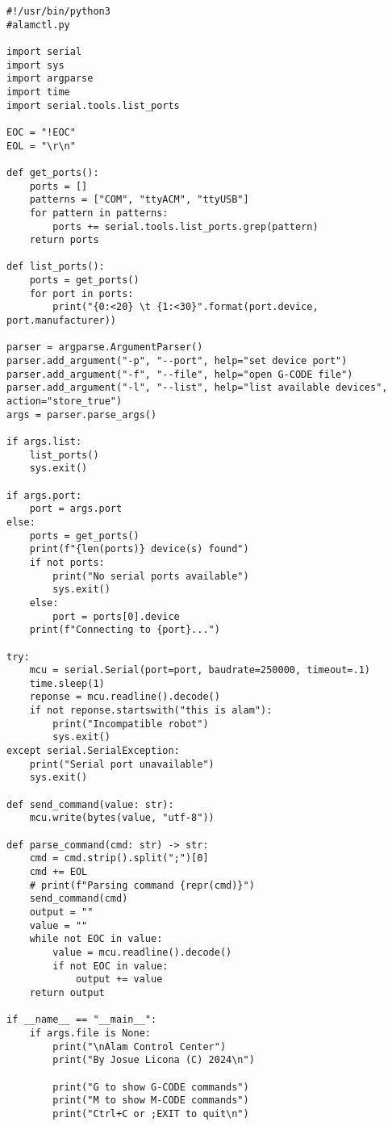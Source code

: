 \begin{verbatim}
#!/usr/bin/python3
#alamctl.py

import serial
import sys
import argparse
import time
import serial.tools.list_ports

EOC = "!EOC"
EOL = "\r\n"

def get_ports():
    ports = []
    patterns = ["COM", "ttyACM", "ttyUSB"]
    for pattern in patterns:
        ports += serial.tools.list_ports.grep(pattern)
    return ports

def list_ports():
    ports = get_ports()
    for port in ports:
        print("{0:<20} \t {1:<30}".format(port.device, port.manufacturer))

parser = argparse.ArgumentParser()
parser.add_argument("-p", "--port", help="set device port")
parser.add_argument("-f", "--file", help="open G-CODE file")
parser.add_argument("-l", "--list", help="list available devices", action="store_true")
args = parser.parse_args()

if args.list:
    list_ports()
    sys.exit()

if args.port:
    port = args.port
else:
    ports = get_ports()
    print(f"{len(ports)} device(s) found")
    if not ports:
        print("No serial ports available")
        sys.exit()
    else:
        port = ports[0].device
    print(f"Connecting to {port}...")

try:
    mcu = serial.Serial(port=port, baudrate=250000, timeout=.1)
    time.sleep(1)
    reponse = mcu.readline().decode()
    if not reponse.startswith("this is alam"):
        print("Incompatible robot")
        sys.exit()
except serial.SerialException:
    print("Serial port unavailable")
    sys.exit()

def send_command(value: str):
    mcu.write(bytes(value, "utf-8"))

def parse_command(cmd: str) -> str:
    cmd = cmd.strip().split(";")[0]
    cmd += EOL
    # print(f"Parsing command {repr(cmd)}")
    send_command(cmd)
    output = ""
    value = ""
    while not EOC in value:
        value = mcu.readline().decode()
        if not EOC in value:
            output += value
    return output

if __name__ == "__main__":
    if args.file is None:
        print("\nAlam Control Center")
        print("By Josue Licona (C) 2024\n")

        print("G to show G-CODE commands")
        print("M to show M-CODE commands")
        print("Ctrl+C or ;EXIT to quit\n")


\end{verbatim}
